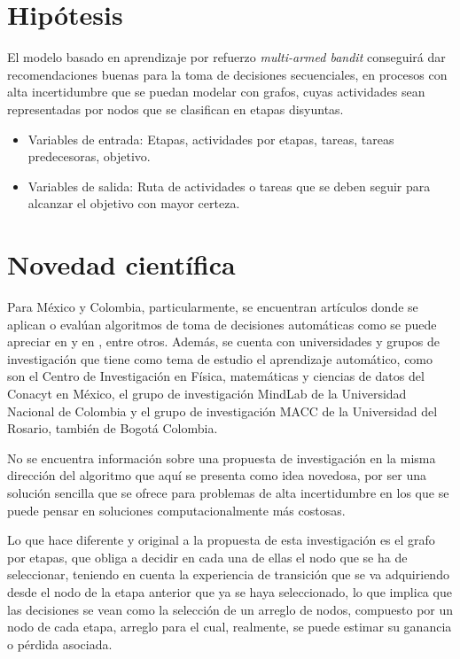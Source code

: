 \section{Hipótesis}

El modelo basado en aprendizaje por refuerzo \textit{multi-armed bandit} conseguirá dar recomendaciones buenas para la toma de decisiones secuenciales, en procesos con alta incertidumbre que se puedan modelar con grafos, cuyas actividades sean representadas por nodos que se clasifican en etapas disyuntas.
\begin{itemize}
\item Variables de entrada: Etapas, actividades por etapas, tareas, tareas predecesoras, objetivo.
\item Variables de salida: Ruta de actividades o tareas que se deben seguir para alcanzar el objetivo con mayor certeza.
\end{itemize}

\section{Novedad científica}

Para México y Colombia, particularmente, se encuentran artículos donde se aplican o evalúan algoritmos de toma de decisiones automáticas como se puede apreciar en \citet{kim2005promoting} y en \citet{lopezdata}, entre otros. Además, se cuenta con universidades y grupos de investigación que tiene como tema de estudio el aprendizaje automático, como son el Centro de Investigación en Física, matemáticas y ciencias de datos del Conacyt en México, el grupo de investigación MindLab de la Universidad Nacional de Colombia y el grupo de investigación MACC de la Universidad del Rosario, también de Bogotá Colombia.

No se encuentra información sobre una propuesta de investigación en la misma dirección del algoritmo que aquí se presenta como idea novedosa, por ser una solución sencilla que se ofrece para problemas de alta incertidumbre en los que se puede pensar en soluciones computacionalmente más costosas.

Lo que hace diferente y original a la propuesta de esta investigación es el grafo por etapas, que obliga a decidir en cada una de ellas el nodo que se ha de seleccionar, teniendo en cuenta la experiencia de transición que se va adquiriendo desde el nodo de la etapa anterior que ya se haya seleccionado, lo que implica que las decisiones se vean como la selección de un arreglo de nodos, compuesto por un nodo de cada etapa, arreglo para el cual, realmente, se puede estimar su ganancia o pérdida asociada.

